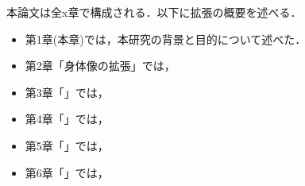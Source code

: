         本論文は全x章で構成される．以下に拡張の概要を述べる．

        \begin{itemize}
                \item 第1章(本章)では，本研究の背景と目的について述べた．
                \item 第2章「身体像の拡張」では，
                \item 第3章「」では，
                \item 第4章「」では，
                \item 第5章「」では，
                \item 第6章「」では，
        \end{itemize}
        


        
